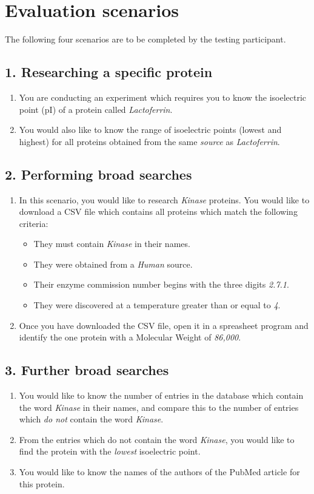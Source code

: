 \chapter{Evaluation scenarios}

The following four scenarios are to be completed by the testing
participant.

\section*{1. Researching a specific protein}
\begin{enumerate}
\item You are conducting an experiment which requires you to know the
  isoelectric point (pI) of a protein called \textit{Lactoferrin}.
\item You would also like to know the range of isoelectric points
  (lowest and highest) for all proteins obtained from the same
  \textit{source} as \textit{Lactoferrin}.
\end{enumerate}

\section*{2. Performing broad searches}
\begin{enumerate}
\item In this scenario, you would like to research \textit{Kinase}
  proteins. You would like to download a CSV file which contains all
  proteins which match the following criteria:
  \begin{itemize}
  \item They must contain \textit{Kinase} in their names.
  \item They were obtained from a \textit{Human} source.
  \item Their enzyme commission number begins with the three digits
    \textit{2.7.1}.
  \item They were discovered at a temperature greater than or equal to \textit{4\celsius}.
  \end{itemize}
\item Once you have downloaded the CSV file, open it in a spreasheet
  program and identify the one protein with a Molecular Weight of
  \textit{86,000}.
\end{enumerate}

\section*{3. Further broad searches}
\begin{enumerate}
\item You would like to know the number of entries in the database
  which contain the word \textit{Kinase} in their names, and compare
  this to the number of entries which \textit{do not} contain the word
  \textit{Kinase}.
\item From the entries which do not contain the word \textit{Kinase},
  you would like to find the protein with the \textit{lowest}
  isoelectric point.
\item You would like to know the names of the authors of the PubMed
  article for this protein.
\end{enumerate}

